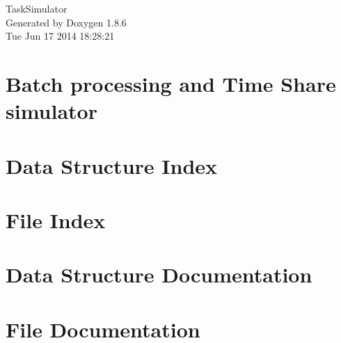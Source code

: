 \documentclass[twoside]{book}
\newcommand{\clearemptydoublepage}{%
  \newpage{\pagestyle{empty}\cleardoublepage}%
}
\begin{document}
\hypersetup{pageanchor=false}
\begin{titlepage}
\vspace*{7cm}
\begin{center}%
{\Large Task\-Simulator }\\
\vspace*{1cm}
{\large Generated by Doxygen 1.8.6}\\
\vspace*{0.5cm}
{\small Tue Jun 17 2014 18:28:21}\\
\end{center}
\end{titlepage}
\clearemptydoublepage
\tableofcontents
\clearemptydoublepage
{}
\hypersetup{pageanchor=true}

\chapter{Batch processing and Time Share simulator}
\label{index}\hypertarget{index}{}
\chapter{Data Structure Index}

\chapter{File Index}

\chapter{Data Structure Documentation}


\chapter{File Documentation}








\newpage
{}
{}
\printindex
\end{document}
